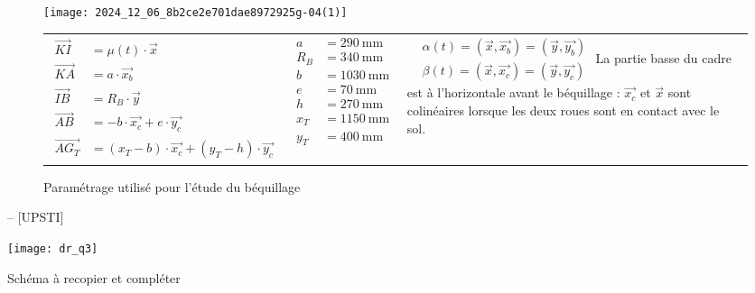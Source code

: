 \begin{figure}[!htb]
\centering

\texttt{[image: 2024\_12\_06\_8b2ce2e701dae8972925g-04(1)]}

\begin{tabular}{p{5cm}p{5cm}p{5cm}}
$
\begin{aligned}
\overrightarrow{K I} & =\mu(t) \cdot \vec{x} \\
\overrightarrow{K A} & =a \cdot \overrightarrow{x_{b}} \\
\overrightarrow{I B} & =R_{B} \cdot \vec{y} \\
\overrightarrow{A B} & =-b \cdot \overrightarrow{x_{c}}+e \cdot \overrightarrow{y_{c}} \\
\overrightarrow{A G_{T}} & =\left(x_{T}-b\right) \cdot \overrightarrow{x_{c}}+\left(y_{T}-h\right) \cdot \overrightarrow{y_{c}}
\end{aligned}
$
&
$
\begin{aligned}
a & =290 \mathrm{~mm} \\
R_{B} & =340 \mathrm{~mm} \\
b & =1030 \mathrm{~mm} \\
e & =70 \mathrm{~mm} \\
h & =270 \mathrm{~mm} \\
x_{T} & =1150 \mathrm{~mm} \\
y_{T} & =400 \mathrm{~mm}
\end{aligned}
$
&
$
\begin{aligned}
& \alpha(t)=\left(\vec{x}, \overrightarrow{x_{b}}\right)=\left(\vec{y}, \overrightarrow{y_{b}}\right) \\
& \beta(t)=\left(\vec{x}, \overrightarrow{x_{c}}\right)=\left(\vec{y}, \overrightarrow{y_{c}}\right)
\end{aligned}
$
La partie basse du cadre est à l'horizontale avant le béquillage : \(\overrightarrow{x_{c}}\) et \(\vec{x}\) sont colinéaires lorsque les deux roues sont en contact avec le sol.
\\
\end{tabular}
\caption{\label{fig_23} Paramétrage utilisé pour l'étude du béquillage}

\end{figure}



\ifprof
\begin{corrige}-- [UPSTI]
\end{corrige}
\else
\fi
\begin{center}
\texttt{[image: dr\_q3]}

Schéma à recopier et compléter
\end{center}

